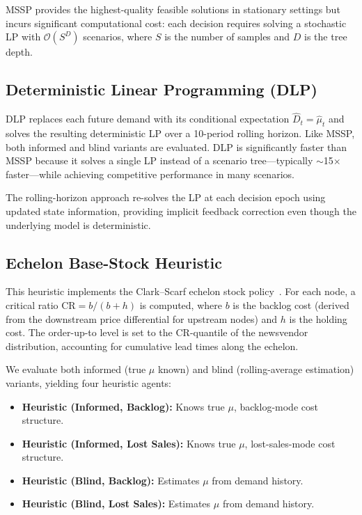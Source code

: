 MSSP provides the highest-quality feasible solutions in stationary
settings but incurs significant computational cost: each decision
requires solving a stochastic LP with $\mathcal{O}(S^D)$ scenarios,
where $S$ is the number of samples and $D$ is the tree depth.

\subsection{Deterministic Linear Programming (DLP)}

DLP replaces each future demand with its conditional expectation
$\hat{D}_t = \hat{\mu}_t$ and solves the resulting deterministic LP
over a 10-period rolling horizon. Like MSSP, both informed and blind
variants are evaluated. DLP is significantly faster than MSSP because
it solves a single LP instead of a scenario tree---typically
$\sim$15$\times$ faster---while achieving competitive performance in
many scenarios.

The rolling-horizon approach re-solves the LP at each decision epoch
using updated state information, providing implicit feedback correction
even though the underlying model is deterministic.

\subsection{Echelon Base-Stock Heuristic}

This heuristic implements the Clark--Scarf echelon stock
policy~\citep{clark1960optimal}. For each node, a critical ratio
$\text{CR} = b / (b + h)$ is computed, where $b$ is the backlog cost
(derived from the downstream price differential for upstream nodes)
and $h$ is the holding cost. The order-up-to level is set to the
$\text{CR}$-quantile of the newsvendor distribution, accounting for
cumulative lead times along the echelon.

We evaluate both informed (true $\mu$ known) and blind
(rolling-average estimation) variants, yielding four heuristic agents:
\begin{itemize}
  \item \textbf{Heuristic (Informed, Backlog):} Knows true $\mu$,
        backlog-mode cost structure.
  \item \textbf{Heuristic (Informed, Lost Sales):} Knows true $\mu$,
        lost-sales-mode cost structure.
  \item \textbf{Heuristic (Blind, Backlog):} Estimates $\mu$ from
        demand history.
  \item \textbf{Heuristic (Blind, Lost Sales):} Estimates $\mu$ from
        demand history.
\end{itemize}

